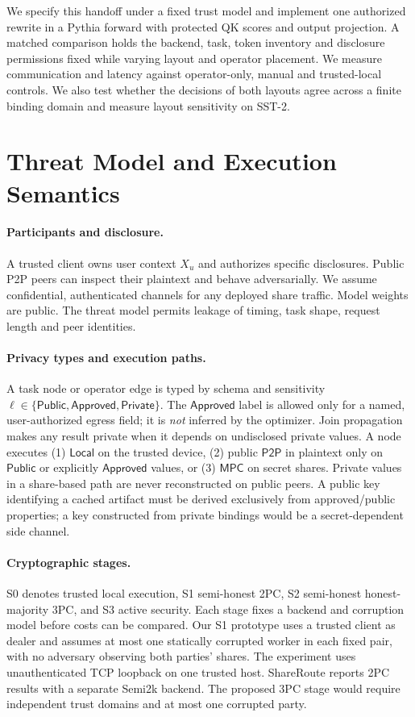 \documentclass[runningheads]{llncs}
\newcommand{\Private}{\ensuremath{\mathsf{Private}}}
\newcommand{\Public}{\ensuremath{\mathsf{Public}}}
\newcommand{\Approved}{\ensuremath{\mathsf{Approved}}}
\newcommand{\Local}{\ensuremath{\mathsf{Local}}}
\newcommand{\MPC}{\ensuremath{\mathsf{MPC}}}
\newcommand{\PtwoP}{\ensuremath{\mathsf{P2P}}}
\begin{document}
We specify this handoff under a fixed trust model and implement one
authorized rewrite in a Pythia forward with protected QK scores and
output projection. A matched comparison holds the backend, task,
token inventory and disclosure permissions fixed while varying layout
and operator placement. We measure communication and latency against
operator-only, manual and trusted-local controls. We also test whether
the decisions of both layouts agree across a finite binding domain
and measure layout sensitivity on SST-2.

\section{Threat Model and Execution Semantics}
\paragraph{Participants and disclosure.}
A trusted client owns user context $X_u$ and authorizes specific disclosures.
Public P2P peers can inspect their plaintext and behave adversarially.
We assume confidential, authenticated channels for any deployed share
traffic. Model weights are public. The threat model permits leakage of
timing, task shape, request length and peer identities.

\paragraph{Privacy types and execution paths.}
A task node or operator edge is typed by schema and sensitivity $\ell\in\{\Public,\Approved,\Private\}$. The $\Approved$ label is allowed only for a named, user-authorized egress field; it is \emph{not} inferred by the optimizer. Join propagation makes any result private when it depends on undisclosed private values. A node executes (1) \Local{} on the trusted device, (2) public $\PtwoP$ in plaintext only on $\Public$ or explicitly $\Approved$ values, or (3) $\MPC$ on secret shares. Private values in a share-based path are never reconstructed on public peers. A public key identifying a cached artifact must be derived exclusively from approved/public properties; a key constructed from private bindings would be a secret-dependent side channel.

\paragraph{Cryptographic stages.}
S0 denotes trusted local execution, S1 semi-honest 2PC, S2 semi-honest
honest-majority 3PC, and S3 active security. Each stage fixes a backend
and corruption model before costs can be compared. Our S1 prototype uses
a trusted client as dealer and assumes at most one statically corrupted
worker in each fixed pair, with no adversary observing both parties' shares.
The experiment uses unauthenticated TCP loopback on one trusted host.
ShareRoute reports 2PC results with a separate Semi2k backend. The proposed
3PC stage would require independent trust domains and at most one
corrupted party.
\end{document}
